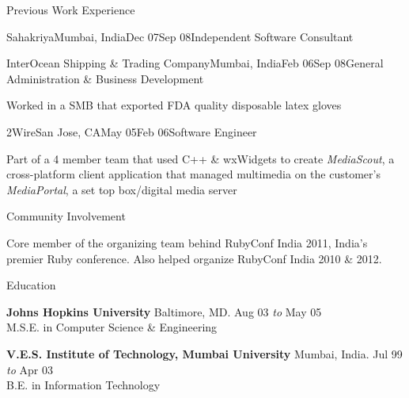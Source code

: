 \documentclass{resume} %
\begin{document}
\begin{rSection}{Previous Work Experience}
\begin{rSubsection}{Sahakriya}{Mumbai, India}{Dec 07}{Sep 08}{Independent Software Consultant}
\end{rSubsection}


\begin{rSubsection}{InterOcean Shipping \& Trading Company}{Mumbai,
    India}{Feb 06}{Sep 08}{General Administration \& Business Development}
\item Worked in a SMB that exported FDA quality disposable latex gloves
\end{rSubsection}


\begin{rSubsection}{2Wire}{San Jose, CA}{May 05}{Feb 06}{Software Engineer}
\item Part of a 4 member team that used C++ \& wxWidgets to create {\em MediaScout}, a cross-platform client application that managed multimedia on the customer's {\em MediaPortal}, a set top box/digital media server
\end{rSubsection}

\end{rSection}


\begin{rSection}{Community Involvement}

Core member of the organizing team behind RubyConf India 2011, India's
premier Ruby conference. Also helped organize RubyConf India 2010 \&
2012.
\end{rSection}



\begin{rSection}{Education}

{\bf Johns Hopkins University} \hfill Baltimore, MD. Aug 03 {\em to} May 05 \\ 
M.S.E. in Computer Science \& Engineering


{\bf V.E.S. Institute of Technology, Mumbai University} \hfill Mumbai, India. Jul 99 {\em to} Apr 03 \\ 
B.E. in Information Technology

\end{rSection}
\end{document}

